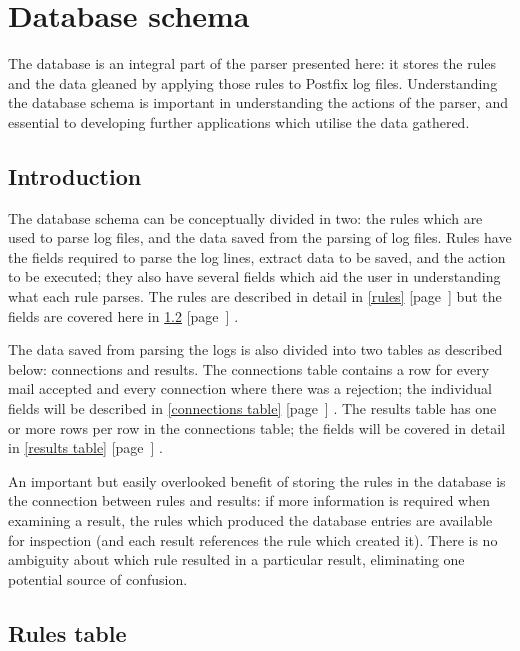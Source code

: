 \documentclass[a4paper,12pt,draft]{article}
\newcommand{\refwithpage}[1]{%
    \empty{}\ref{#1} [page~\pageref{#1}]%
}
\newcommand{\sectionref}[1]{%
    \textsection{}\refwithpage{#1}%
}
\begin{document}
\section{Database schema}
\label{database schema}

The database is an integral part of the parser presented here: it stores
the rules and the data gleaned by applying those rules to Postfix log
files.  Understanding the database schema is important in understanding the
actions of the parser, and essential to developing further applications
which utilise the data gathered.

\subsection{Introduction}

The database schema can be conceptually divided in two: the rules which are
used to parse log files, and the data saved from the parsing of log files.
Rules have the fields required to parse the log lines, extract data to be
saved, and the action to be executed; they also have several fields which
aid the user in understanding what each rule parses.  The rules are
described in detail in \sectionref{rules} but the fields are covered here
in \sectionref{rule attributes}.

The data saved from parsing the logs is also divided into two tables as
described below: connections and results.  The connections table contains a
row for every mail accepted and every connection where there was a
rejection; the individual fields will be described in
\sectionref{connections table}.  The results table has one or more rows per
row in the connections table; the fields will be covered in detail in
\sectionref{results table}.

An important but easily overlooked benefit of storing the rules in the
database is the connection between rules and results: if more information
is required when examining a result, the rules which produced the database
entries are available for inspection (and each result references the rule
which created it).  There is no ambiguity about which rule resulted in a
particular result, eliminating one potential source of confusion.

\subsection{Rules table}

\label{rule attributes}
\end{document}
